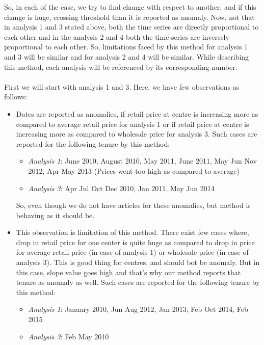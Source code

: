 \documentclass[a4paper,10pt]{report}
\begin{document}
		So, in each of the case, we try to find change with respect to another, and if this change is huge, crossing threshold than it is reported as anomaly. Now, not that in analysis 1 and 3 stated above, both the time series are directly proportional to each other and in the analysis 2 and 4 both the time series are inversely proportional to each other. So, limitations faced by this method for analysis 1 and 3 will be similar and for analysis 2 and 4 will be similar. While describing this method, each analysis will be referenced by its corresponding number.\\
		\\
		First we will start with analysis 1 and 3. Here, we have few observations as follows:
		\begin{itemize}
			\item Dates are reported as anomalies, if retail price at centre is increasing more as compared to average retail price for analysis 1 or if retail price at centre is increasing more as compared to wholesale price for analysis 3.
			Such cases are reported for the following tenure by this method:
			\begin{itemize}
				\item \textit{Analysis 1}: June 2010, August 2010, May 2011, June 2011, May Jun Nov 2012, Apr May 2013 (Prices went too high as compared to average)
				\item \textit{Analysis 3}: Apr Jul Oct Dec 2010, Jan 2011, May Jun 2014
			\end{itemize}
			
			So, even though we do not have articles for these anomalies, but method is behaving as it should be. 			
			
			\item This observation is limitation of this method. There exist few cases where, drop in retail price for one center is quite huge as compared to drop in price for average retail price (in case of analysis 1) or wholesale price (in case of analysis 3). This is good thing for centres, and should bot be anomaly. But in this case, slope value goes high and that's why our method reports that tenure as anomaly as well.
			Such cases are reported for the following tenure by this method:
			\begin{itemize}
				\item \textit{Analysis 1}: January 2010, Jun Aug 2012, Jan 2013, Feb Oct 2014, Feb 2015
				\item \textit{Analysis 3}: Feb May 2010
			\end{itemize}
			

\end{itemize}
\end{document}

